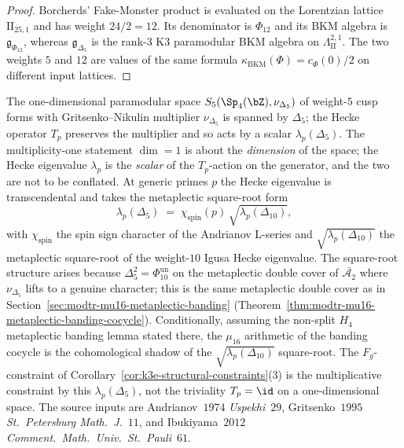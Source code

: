 \begin{proof}
Borcherds' Fake-Monster product is evaluated on the Lorentzian lattice
$\mathrm{II}_{25,1}$ and has weight $24/2=12$. Its denominator is
$\Phi_{12}$ and its BKM algebra is $\mathfrak g_{\Phi_{12}}$, whereas
$\mathfrak g_{\Delta_5}$ is the rank-$3$ K3 paramodular BKM algebra on
$\Lambda^{2,1}_{\mathrm{II}}$. The two weights $5$ and $12$ are
values of the same formula $\kappa_{\mathrm{BKM}}(\Phi)=c_\Phi(0)/2$ on different
input lattices.
\end{proof}

\begin{remark}
\label{rem:modtr-hecke-eigenvalue-metaplectic}
The one-dimensional paramodular space $S_5(\Sp_4(\bZ), \nu_{\Delta_5})$
of weight-$5$ cusp forms with Gritsenko--Nikulin multiplier $\nu_{\Delta_5}$
is spanned by $\Delta_5$; the Hecke operator $T_p$ preserves the
multiplier and so acts by a scalar $\lambda_p(\Delta_5)$. The
multiplicity-one statement $\dim = 1$ is about the \emph{dimension} of
the space; the Hecke eigenvalue $\lambda_p$ is the \emph{scalar} of
the $T_p$-action on the generator, and the two are not to be conflated.
At generic primes $p$ the Hecke eigenvalue is transcendental and
takes the metaplectic square-root form
\[
 \lambda_p(\Delta_5)
 \;=\; \chi_{\mathrm{spin}}(p)\,\sqrt{\lambda_p(\Delta_{10})},
\]
with $\chi_{\mathrm{spin}}$ the spin sign character of the Andrianov
L-series and $\sqrt{\lambda_p(\Delta_{10})}$ the metaplectic square-root
of the weight-$10$ Igusa Hecke eigenvalue. The square-root structure
arises because $\Delta_5^2 = \Phi_{10}^{\mathrm{un}}$ on the metaplectic double cover
of $\bar{\mathcal A_2}$ where $\nu_{\Delta_5}$ lifts to a genuine
character; this is the same metaplectic double cover as in
Section~\ref{sec:modtr-mu16-metaplectic-banding}
(Theorem~\ref{thm:modtr-mu16-metaplectic-banding-cocycle}). Conditionally,
assuming the non-split $H_4$ metaplectic banding lemma stated there, the
$\mu_{16}$ arithmetic of the banding cocycle is the cohomological
shadow of the $\sqrt{\lambda_p(\Delta_{10})}$ square-root. The
$F_g$-constraint of
Corollary~\ref{cor:k3e-structural-constraints}(3) is the
multiplicative constraint by this $\lambda_p(\Delta_5)$, not the
triviality $T_p = \id$ on a one-dimensional space.
The source inputs are Andrianov~$1974$ \emph{Uspekhi}~$29$,
Gritsenko~$1995$ \emph{St.~Petersburg Math.~J.}~$11$, and
Ibukiyama~$2012$ \emph{Comment.~Math.~Univ.~St.~Pauli}~$61$.
\end{remark}

